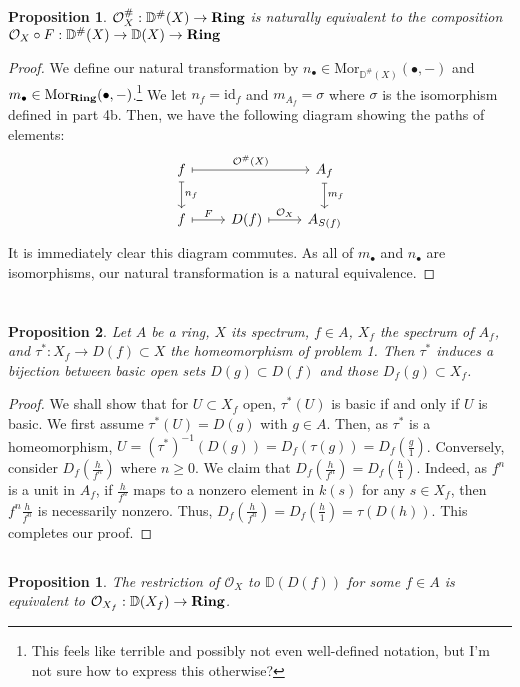 \documentclass[english]{article}
\newcommand{\mor}{\mathrm{Mor}}
\newcommand{\DD}{\mathbb{D}}
\newcommand{\OO}{\mathcal{O}}
\newcommand{\prob}[1]{\setcounter{section}{#1-1}\section{}}
\newcommand{\prt}[1]{\setcounter{subsection}{#1-1}\subsection{}}
\newtheorem{proposition}[theorem]{Proposition}
\newtheorem*{proposition*}{Proposition}
\theoremstyle{remark}
\theoremstyle{definition}
\newcommand{\id}{\mathrm{id}}
\newcommand{\cat}[1]{{\mathrm{\bf{#1}}}}
\begin{document}
\prt{4}
\begin{proposition*}
$\OO^\#_X:\DD^\#(X)\to \cat{Ring}$ is naturally equivalent to the composition $\OO_X\circ F:\DD^\#(X)\to\DD(X)\to \cat{Ring}$
\end{proposition*}\begin{proof}
We define our natural transformation by $n_{\bullet}\in \mor_{\DD^\#(X)}(\bullet,-)$ and $m_{\bullet}\in \mor_{\cat{Ring}}(\bullet,-)$.\footnote{This feels like terrible and possibly not even well-defined notation, but I'm not sure how to express this otherwise?} We let $n_{f}=\id_{f}$ and $m_{A_{f}}=\sigma$ where $\sigma$ is the isomorphism defined in part 4b. Then, we have the following diagram showing the paths of elements:
$$
\begin{tikzcd}
 f\arrow[mapsto]{rr}{\OO^\#(X)}\arrow[mapsto]{d}{n_f}&&A_f\arrow[mapsto]{d}{m_{f}}\\
 f\arrow[mapsto]{r}{F}&D(f)\arrow[mapsto]{r}{\OO_X}&A_{S(f)}
\end{tikzcd}
$$ It is immediately clear this diagram commutes.
As all of $m_{\bullet}$ and $n_{\bullet}$ are isomorphisms, our natural transformation is a natural equivalence.
\end{proof}
\prob{5}
\prt{1}\begin{proposition*}
	Let $A$ be a ring, $X$ its spectrum, $f\in A$, $X_f$ the spectrum of $A_f$, and $\tau^*:X_f\to D(f)\subset X$ the homeomorphism of problem 1. Then $\tau^*$ induces a bijection between basic open sets $D(g)\subset D(f)$ and those $D_f(g)\subset X_f$.
\end{proposition*}
\begin{proof}
We shall show that for $U\subset X_f$ open, $\tau^*(U)$ is basic if and only if $U$ is basic. We first assume $\tau^*(U)=D(g)$ with $g\in A$. Then, as $\tau^*$ is a homeomorphism, $U=(\tau^*)^{-1}(D(g))=D_f(\tau(g))=D_f(\frac{g}{1})$. Conversely, consider $D_f(\frac{h}{f^n})$ where $n\geq 0$. We claim that $D_f(\frac{h}{f^n})=D_f(\frac{h}{1})$. Indeed, as $f^n$ is a unit in $A_f$, if $\frac{h}{f^n}$ maps to a nonzero element in $k(s)$ for any $s\in X_f$, then $f^n\frac{h}{f^n}$ is necessarily nonzero. Thus, $D_f(\frac{h}{f^n})=D_f(\frac{h}{1})=\tau(D(h))$. This completes our proof. 
\end{proof}
\prt{2}
\begin{proposition}
	The restriction of $\OO_X$ to $\DD(D(f))$ for some $f\in A$ is equivalent to $\OO_{X_f}:\DD(X_f)\to \cat{Ring}$.
\end{proposition}
\end{document}
